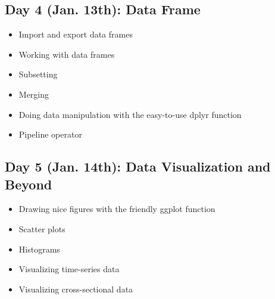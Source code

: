 \documentclass[11pt, a4paper]{article}
\begin{document}
\subsection*{Day 4 (Jan. 13th): Data Frame}

\begin{itemize}
   \item Import and export data frames
   \item Working with data frames
   \item Subsetting
   \item Merging
   \item Doing data manipulation with the easy-to-use dplyr function
   \item Pipeline operator
\end{itemize}


\subsection*{Day 5 (Jan. 14th): Data Visualization and Beyond}

\begin{itemize}
   \item Drawing nice figures with the friendly ggplot function
   \item Scatter plots 
   \item Histograms
   \item Visualizing time-series data
   \item Visualizing cross-sectional data

\end{itemize}

\end{document}
